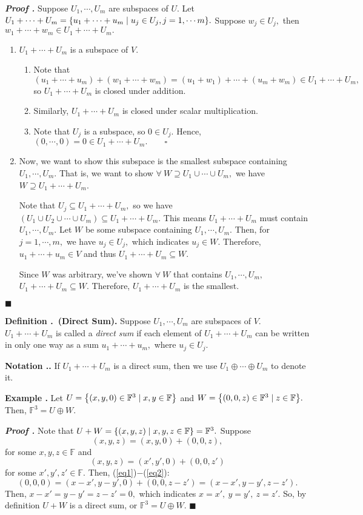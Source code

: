 \documentclass[11pt, letterpaper]{article}
\newcounter{index}[subsection]
\newenvironment*{df}[1]{\par\noindent\textbf{Definition \thesubsection.\stepcounter{index}\theindex\ (#1).}}{\par}
\newenvironment*{eg}{\begin{framed}\par\noindent\textbf{Example \thesubsection.\stepcounter{index}\theindex}}{\par\end{framed}}
\newenvironment*{nota}{\par\noindent\textbf{Notation \thesubsection.\stepcounter{index}\theindex.}}{\par}
\newcounter{nprf}[subsection]
\newenvironment*{prf}{\par\indent\textbf{\textit{Proof \stepcounter{nprf}\thenprf.}}}{\hfill$\blacksquare$\par}
\def\F{\mathbb{F}}
\begin{document}
	\begin{prf}
		Suppose $U_1,\cdots,U_m$ are subspaces of $U$. Let $U_1+\cdots+U_m=\qty{u_1+\cdots+u_m\mid u_j\in U_j, j=1,\cdots m}.$ Suppose $w_j\in U_j,$ then $w_1+\cdots+w_m\in U_1+\cdots+U_m.$
		\begin{enumerate}
			\item $U_1+\cdots+U_m$ is a subspace of $V$.
			\begin{enumerate}
				\item Note that \[(u_1+\cdots+u_m)+(w_1+\cdots+w_m)=(u_1+w_1)+\cdots+(u_m+w_m)\in U_1+\cdots+U_m,\] so $U_1+\cdots+U_m$ is closed under addition.
				\item Similarly, $U_1+\cdots+U_m$ is closed under scalar multiplication.
				\item Note that $U_j$ is a subspace, so $0\in U_j.$ Hence, $(0,\cdots,0)=0\in U_1+\cdots+U_m.\qquad\square$
			\end{enumerate}
			\item Now, we want to show this subspace is the smallest subspace containing $U_1,\cdots,U_m.$ That is, we want to show $\forall\ W\supseteq U_1\cup\cdots\cup U_m,$ we have $W\supseteq U_1+\cdots+U_m$.\par Note that $U_j\subseteq U_1+\cdots+U_m,$ so we have $(U_1\cup U_2\cup\cdots\cup U_m)\subseteq U_1+\cdots+U_m$. This means $U_1+\cdots+U_m$ must contain $U_1,\cdots,U_m.$ Let $W$ be some subspace containing $U_1,\cdots,U_m.$ Then, for $j=1,\cdots,m,$ we have $u_j\in U_j,$ which indicates $u_j\in W.$ Therefore, $u_1+\cdots+u_m\in V$ and thus $U_1+\cdots+U_m\subseteq W.$\par Since $W$ was arbitrary, we've shown $\forall\ W$ that contains $U_1,\cdots,U_m,$ $U_1+\cdots+U_m\subseteq W.$ Therefore, $U_1+\cdots+U_m$ is the smallest. 
		\end{enumerate}
	\end{prf}
\begin{df}{Direct Sum}
	Suppose $U_1,\cdots,U_m$ are subspaces of $V.$ $U_1+\cdots+U_m$ is called a \textit{direct sum} if each element of $U_1+\cdots+U_m$ can be written in only one way as a sum $u_1+\cdots+u_m,$ where $u_j\in U_j.$
\end{df}
\begin{nota}
	If $U_1+\cdots+U_m$ is a direct sum, then we use $U_1\oplus\cdots\oplus U_m$ to denote it.	
\end{nota}
\begin{eg}
	Let $U=\qty{(x,y,0)\in\F^3\mid x,y\in\F}$ and $W=\qty{(0,0,z)\in\F^3\mid z\in\F}.$ Then, $\F^3=U\oplus W.$
	\begin{prf}
		Note that $U+W=\qty{(x,y,z)\mid x,y,z\in\F}=\F^3.$ Suppose \begin{equation}\label{eq1}(x,y,z)=(x,y,0)+(0,0,z),\end{equation} for some $x,y,z\in\F$ and \begin{equation}\label{eq2}(x,y,z)=(x',y',0)+(0,0,z')\end{equation} for some $x',y',z'\in\F.$ Then, (\ref{eq1})$-$(\ref{eq2}): \[(0,0,0)=(x-x',y-y',0)+(0,0,z-z')=(x-x',y-y',z-z').\] Then, $x-x'=y-y'=z-z'=0,$ which indicates $x=x',\ y=y',\ z=z'.$ So, by definition $U+W$ is a direct sum, or $\F^3=U\oplus W.$
	\end{prf}
\end{eg}
\end{document}
